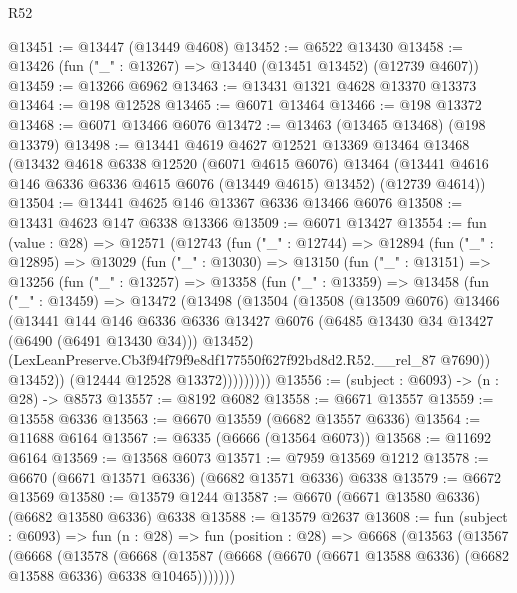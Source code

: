 \begin{lexlean}{R52}
\begin{coremodule}
@13451 := @13447 (@13449 @4608)
@13452 := @6522 @13430
@13458 := @13426 (fun ("_" : @13267) => @13440 (@13451 @13452) (@12739 @4607))
@13459 := @13266 @6962
@13463 := @13431 @1321 @4628 @13370 @13373
@13464 := @198 @12528
@13465 := @6071 @13464
@13466 := @198 @13372
@13468 := @6071 @13466 @6076
@13472 := @13463 (@13465 @13468) (@198 @13379)
@13498 := @13441
    @4619
    @4627
    @12521
    @13369
    @13464
    @13468
    (@13432
      @4618
      @6338
      @12520
      (@6071 @4615 @6076)
      @13464
      (@13441 @4616 @146 @6336 @6336 @4615 @6076 (@13449 @4615) @13452)
      (@12739 @4614))
@13504 := @13441 @4625 @146 @13367 @6336 @13466 @6076
@13508 := @13431 @4623 @147 @6338 @13366
@13509 := @6071 @13427
@13554 := fun (value : @28) =>
  @12571
    (@12743
      (fun ("_" : @12744) =>
      @12894
        (fun ("_" : @12895) =>
        @13029
          (fun ("_" : @13030) =>
          @13150
            (fun ("_" : @13151) =>
            @13256
              (fun ("_" : @13257) =>
              @13358
                (fun ("_" : @13359) =>
                @13458
                  (fun ("_" : @13459) =>
                  @13472
                    (@13498
                      (@13504
                        (@13508
                          (@13509 @6076)
                          @13466
                          (@13441
                            @144
                            @146
                            @6336
                            @6336
                            @13427
                            @6076
                            (@6485 @13430 @34 @13427 (@6490 (@6491 @13430 @34)))
                            @13452)
                          (LexLeanPreserve.Cb3f94f79f9e8df177550f627f92bd8d2.R52.__rel_87 @7690))
                        @13452))
                    (@12444 @12528 @13372)))))))))
@13556 := (subject : @6093) -> (n : @28) -> @8573
@13557 := @8192 @6082
@13558 := @6671 @13557
@13559 := @13558 @6336
@13563 := @6670 @13559 (@6682 @13557 @6336)
@13564 := @11688 @6164
@13567 := @6335 (@6666 (@13564 @6073))
@13568 := @11692 @6164
@13569 := @13568 @6073
@13571 := @7959 @13569 @1212
@13578 := @6670 (@6671 @13571 @6336) (@6682 @13571 @6336) @6338
@13579 := @6672 @13569
@13580 := @13579 @1244
@13587 := @6670 (@6671 @13580 @6336) (@6682 @13580 @6336) @6338
@13588 := @13579 @2637
@13608 := fun (subject : @6093) =>
  fun (n : @28) =>
  fun (position : @28) =>
  @6668
    (@13563
      (@13567
        (@6668
          (@13578
            (@6668
              (@13587 (@6668 (@6670 (@6671 @13588 @6336) (@6682 @13588 @6336) @6338 @10465)))))))

\end{coremodule}
\end{lexlean}
